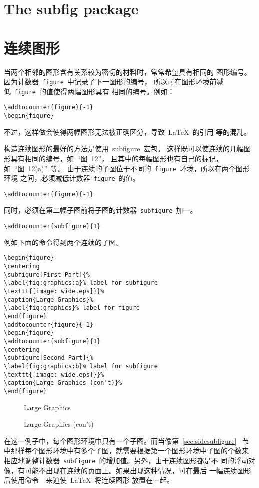 \section{The subfig package}

\section{连续图形}

当两个相邻的图形含有关系较为密切的材料时，常常希望具有相同的
图形编号。因为计数器~\texttt{figure}~中记录了下一图形的编号，
所以可在图形环境前减低~\texttt{figure}~的值使得两幅图形具有
相同的编号。例如：
\begin{Verbatim}[xleftmargin=1cm]
\addtocounter{figure}{-1} 
\begin{figure}
\end{Verbatim}
不过，这样做会使得两幅图形无法被正确区分，导致~\LaTeX{}~的引用
等的混乱。

构造连续图形的最好的方法是使用~\textsf{subfigure}~宏包。
这样既可以使连续的几幅图形具有相同的编号，如~``{图}~12''，
且其中的每幅图形也有自己的标记，如~``{图}~12(a)''~等。
由于连续的子图位于不同的~\texttt{figure}~环境，所以在两个图形环境
之间，必须减低计数器~\texttt{figure}~的值。
\begin{Verbatim}[xleftmargin=1cm]
\addtocounter{figure}{-1} 
\end{Verbatim}
同时，必须在第二幅子图前将子图的计数器~\texttt{subfigure}~加一。
\begin{Verbatim}[xleftmargin=1cm]
\addtocounter{subfigure}{1}
\end{Verbatim}
例如下面的命令得到两个连续的子图。
\begin{Verbatim}[xleftmargin=1cm]
\begin{figure} 
\centering 
\subfigure[First Part]{% 
\label{fig:graphics:a}% label for subfigure 
\texttt{[image: wide.eps]}}% 
\caption{Large Graphics}% 
\label{fig:graphics}% label for figure
\end{figure} 
\addtocounter{figure}{-1} 
\begin{figure} 
\addtocounter{subfigure}{1} 
\centering 
\subfigure[Second Part]{% 
\label{fig:graphics:b}% label for subfigure 
\texttt{[image: wide.eps]}}% 
\caption{Large Graphics (con't)}% 
\end{figure}
\end{Verbatim}

\begin{figure} 
	\centering 
	\caption{Large Graphics}%
	\label{fig:graphics}%
\end{figure} 
\addtocounter{figure}{-1} 
\begin{figure} 
	\addtocounter{subfigure}{1} 
	\centering 
	\caption{Large Graphics (con't)}%
\end{figure}

在这一例子中，每个图形环境中只有一个子图。而当像第~\ref{sec:sidesubfigure}~
节中那样每个图形环境中有多个子图，就需要根据第一个图形环境中子图的个数来
相应地调整计数器~\texttt{subfigure}~的增加值。另外，由于连续图形都是不
同的浮动对像，有可能不出现在连续的页面上。如果出现这种情况，可在最后
一幅连续图形后使用命令~~来迫使~\LaTeX{}~将连续图形
放置在一起。


\endinput
